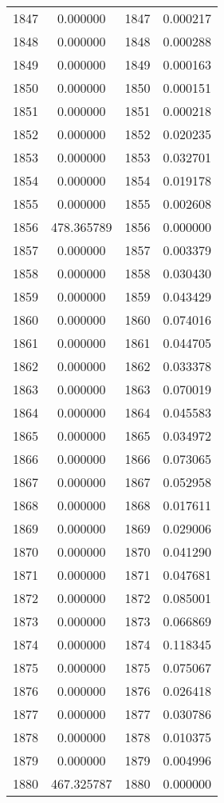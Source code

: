 \documentclass[12pt]{article}
\begin{document}
\begin{longtable}{@{}cccc@{}}
1847 & 0.000000 & 1847 & 0.000217 \\
1848 & 0.000000 & 1848 & 0.000288 \\
1849 & 0.000000 & 1849 & 0.000163 \\
1850 & 0.000000 & 1850 & 0.000151 \\
1851 & 0.000000 & 1851 & 0.000218 \\
1852 & 0.000000 & 1852 & 0.020235 \\
1853 & 0.000000 & 1853 & 0.032701 \\
1854 & 0.000000 & 1854 & 0.019178 \\
1855 & 0.000000 & 1855 & 0.002608 \\
1856 & 478.365789 & 1856 & 0.000000 \\
1857 & 0.000000 & 1857 & 0.003379 \\
1858 & 0.000000 & 1858 & 0.030430 \\
1859 & 0.000000 & 1859 & 0.043429 \\
1860 & 0.000000 & 1860 & 0.074016 \\
1861 & 0.000000 & 1861 & 0.044705 \\
1862 & 0.000000 & 1862 & 0.033378 \\
1863 & 0.000000 & 1863 & 0.070019 \\
1864 & 0.000000 & 1864 & 0.045583 \\
1865 & 0.000000 & 1865 & 0.034972 \\
1866 & 0.000000 & 1866 & 0.073065 \\
1867 & 0.000000 & 1867 & 0.052958 \\
1868 & 0.000000 & 1868 & 0.017611 \\
1869 & 0.000000 & 1869 & 0.029006 \\
1870 & 0.000000 & 1870 & 0.041290 \\
1871 & 0.000000 & 1871 & 0.047681 \\
1872 & 0.000000 & 1872 & 0.085001 \\
1873 & 0.000000 & 1873 & 0.066869 \\
1874 & 0.000000 & 1874 & 0.118345 \\
1875 & 0.000000 & 1875 & 0.075067 \\
1876 & 0.000000 & 1876 & 0.026418 \\
1877 & 0.000000 & 1877 & 0.030786 \\
1878 & 0.000000 & 1878 & 0.010375 \\
1879 & 0.000000 & 1879 & 0.004996 \\
1880 & 467.325787 & 1880 & 0.000000 \\

\end{longtable}
\end{document}
